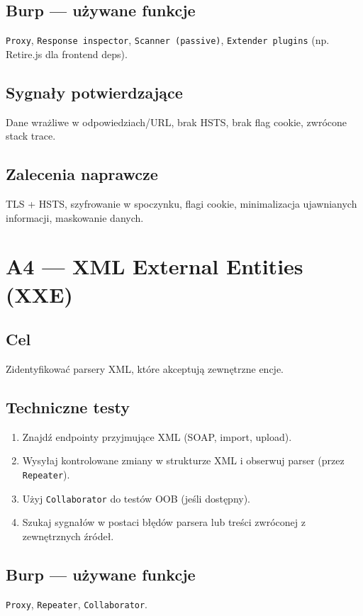 \documentclass[11pt,a4paper]{article}
\begin{document}
	\subsection*{Burp --- używane funkcje}
	\texttt{Proxy}, \texttt{Response inspector}, \texttt{Scanner (passive)}, \texttt{Extender plugins} (np. Retire.js dla frontend deps).
	
	\subsection*{Sygnały potwierdzające}
	Dane wrażliwe w odpowiedziach/URL, brak HSTS, brak flag cookie, zwrócone stack trace.
	
	\subsection*{Zalecenia naprawcze}
	TLS + HSTS, szyfrowanie w spoczynku, flagi cookie, minimalizacja ujawnianych informacji, maskowanie danych.
	
	\newpage
	\section{A4 --- XML External Entities (XXE)}
	\subsection*{Cel}
	Zidentyfikować parsery XML, które akceptują zewnętrzne encje.
	
	\subsection*{Techniczne testy}
	\begin{enumerate}[leftmargin=*,label=\arabic*)]
		\item Znajdź endpointy przyjmujące XML (SOAP, import, upload).
		\item Wysyłaj kontrolowane zmiany w strukturze XML i obserwuj parser (przez \texttt{Repeater}).
		\item Użyj \texttt{Collaborator} do testów OOB (jeśli dostępny).
		\item Szukaj sygnałów w postaci błędów parsera lub treści zwróconej z zewnętrznych źródeł.
	\end{enumerate}
	
	\subsection*{Burp --- używane funkcje}
	\texttt{Proxy}, \texttt{Repeater}, \texttt{Collaborator}.
	
\end{document}
